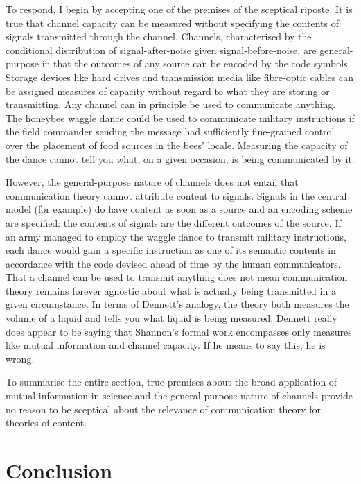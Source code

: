 \documentclass[12pt]{article}
\begin{document}
\noindent To respond, I begin by accepting one of the premises of the sceptical riposte.
It is true that channel capacity can be measured without specifying the contents of signals transmitted through the channel.
Channels, characterised by the conditional distribution of signal-after-noise given signal-before-noise, are general-purpose in that the outcomes of any source can be encoded by the code symbols.
Storage devices like hard drives and transmission media like fibre-optic cables can be assigned measures of capacity without regard to what they are storing or transmitting.
Any channel can in principle be used to communicate anything.
The honeybee waggle dance could be used to communicate military instructions if the field commander sending the message had sufficiently fine-grained control over the placement of food sources in the bees' locale.
Measuring the capacity of the dance cannot tell you what, on a given occasion, is being communicated by it.

However, the general-purpose nature of channels does not entail that communication theory cannot attribute content to signals.
Signals in the central model (for example) do have content as soon as a source and an encoding scheme are specified: the contents of signals are the different outcomes of the source.
If an army managed to employ the waggle dance to transmit military instructions, each dance would gain a specific instruction as one of its semantic contents in accordance with the code devised ahead of time by the human communicators.
That a channel can be used to transmit anything does not mean communication theory remains forever agnostic about what is actually being transmitted in a given circumstance.
In terms of Dennett's analogy, the theory both measures the volume of a liquid and tells you what liquid is being measured.
Dennett really does appear to be saying that Shannon's formal work encompasses only measures like mutual information and channel capacity.
If he means to say this, he is wrong.

To summarise the entire section, true premises about the broad application of mutual information in science and the general-purpose nature of channels provide no reason to be sceptical about the relevance of communication theory for theories of content.

\section{Conclusion}\label{sec:conclusion}
\end{document}
